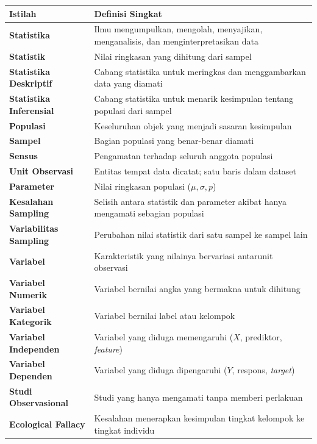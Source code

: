 \documentclass[
  indonesian,
  letterpaper,
]{book}
\newcounter{none} %
\begin{document}
{\def\LTcaptype{none} %
\begin{longtable}[]{@{}
  >{\raggedright\arraybackslash}p{}
  >{\raggedright\arraybackslash}p{}@{}}
\toprule\noalign{}
\begin{minipage}[b]{\linewidth}\raggedright
Istilah
\end{minipage} & \begin{minipage}[b]{\linewidth}\raggedright
Definisi Singkat
\end{minipage} \\
\midrule\noalign{}
\endhead
\bottomrule\noalign{}
\endlastfoot
\textbf{Statistika} & Ilmu mengumpulkan, mengolah, menyajikan,
menganalisis, dan menginterpretasikan data \\
\textbf{Statistik} & Nilai ringkasan yang dihitung dari sampel \\
\textbf{Statistika Deskriptif} & Cabang statistika untuk meringkas dan
menggambarkan data yang diamati \\
\textbf{Statistika Inferensial} & Cabang statistika untuk menarik
kesimpulan tentang populasi dari sampel \\
\textbf{Populasi} & Keseluruhan objek yang menjadi sasaran kesimpulan \\
\textbf{Sampel} & Bagian populasi yang benar-benar diamati \\
\textbf{Sensus} & Pengamatan terhadap seluruh anggota populasi \\
\textbf{Unit Observasi} & Entitas tempat data dicatat; satu baris dalam
dataset \\
\textbf{Parameter} & Nilai ringkasan populasi (\(\mu, \sigma, p\)) \\
\textbf{Kesalahan Sampling} & Selisih antara statistik dan parameter
akibat hanya mengamati sebagian populasi \\
\textbf{Variabilitas Sampling} & Perubahan nilai statistik dari satu
sampel ke sampel lain \\
\textbf{Variabel} & Karakteristik yang nilainya bervariasi antarunit
observasi \\
\textbf{Variabel Numerik} & Variabel bernilai angka yang bermakna untuk
dihitung \\
\textbf{Variabel Kategorik} & Variabel bernilai label atau kelompok \\
\textbf{Variabel Independen} & Variabel yang diduga memengaruhi (\(X\),
prediktor, \emph{feature}) \\
\textbf{Variabel Dependen} & Variabel yang diduga dipengaruhi (\(Y\),
respons, \emph{target}) \\
\textbf{Studi Observasional} & Studi yang hanya mengamati tanpa memberi
perlakuan \\
\textbf{Ecological Fallacy} & Kesalahan menerapkan kesimpulan tingkat
kelompok ke tingkat individu \\
\end{longtable}
}
\end{document}
